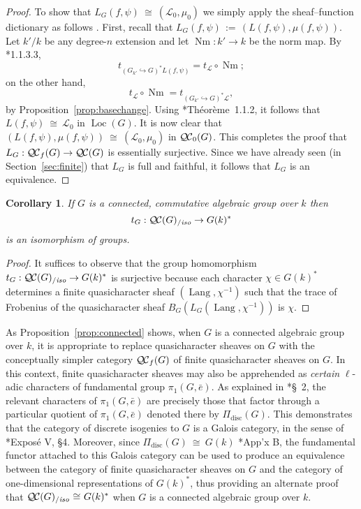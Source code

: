 \documentclass[11pt]{amsart}
\theoremstyle{plain}
\newtheorem{corollary}[theorem]{Corollary}
\theoremstyle{definition}
\theoremstyle{remark}
\newcommand{\bFq}{\bar{k}}
\newcommand{\Fq}{k}
\DeclareMathOperator{\Gal}{Gal}
\DeclareMathOperator{\Nm}{Nm}
\newcommand{\ceq}{{\, :=\, }}
\newcommand{\iso}{{\ \cong\ }}
\newcommand{\qcs}[1]{{\mathcal{#1}}}
\newcommand{\QC}{{\mathcal{Q\hskip-0.8pt C}}}
\newcommand{\QCb}{{\QC_0}}
\newcommand{\QCf}{{\QC_f}}
\newcommand{\QCiso}[1]{\QC(#1)_{/\textit{iso}}}
\newcommand{\Lang}{{\operatorname{Lang}}}
\newcommand{\Loc}{{\operatorname{Loc}}}
\newcommand{\trFrob}[1]{t_{#1}}
\newcommand\Clifton[1]{\marginpar{\smaller\smaller CC: #1}}
\begin{document}
\begin{proof}
  To show that $L_G(f,\psi) \iso (\qcs{L}_0,\mu_0)$ we simply apply the sheaf--function dictionary
  as follows .
  First, recall that $L_G(f,\psi) \ceq (L(f,\psi), \mu(f,\psi))$.
  Let $k'/k$ be any degree-$n$ extension and let $\Nm : k'\to k$ be the norm map. 
  By \cite{laumon:87a}*{1.1.3.3}, 
  \[
  \trFrob{(G_{k'}\hookrightarrow G)^*L(f,\psi)} = \trFrob{\qcs{L}} \circ \Nm;
  \]
  on the other hand, 
  \[
  \trFrob{\qcs{L}} \circ \Nm = \trFrob{(G_{k'}\hookrightarrow G)^*\qcs{L}},
  \]
   by Proposition~\ref{prop:basechange}.
  Using \cite{laumon:87a}*{Th\'eor\`eme~1.1.2}, it follows that  $L(f,\psi) \iso \qcs{L}_0$ in $\Loc(G)$.
  It is now clear that $(L(f,\psi),\mu(f,\psi)) \iso (\qcs{L}_0,\mu_0)$ in $\QCb(G)$.
  This completes the proof that $L_G : \QCf(G) \to \QC(G)$ is essentially surjective.
  Since we have already seen (in Section~\ref{sec:finite}) that $L_G$ is full and faithful, 
  it follows that $L_G$ is an equivalence.
\end{proof}

\begin{corollary}
 If $G$ is a connected, commutative algebraic group over $\Fq$ then
 \[
  \trFrob{G} : \QCiso{G} \to G(\Fq)^*
 \]
 is an isomorphism of groups.
\end{corollary}
\begin{proof}
 It suffices to observe that the group homomorphism
 $\trFrob{G} : \QCiso{G} \to G(\Fq)^*$
 is surjective because each character $\chi \in G(\Fq)^*$ determines a finite quasicharacter
 sheaf $(\Lang,\chi^{-1})$ such that the trace of Frobenius of the quasicharacter sheaf
 $B_G (L_G(\Lang,\chi^{-1}))$ is $\chi$.
\end{proof}

As Proposition~\ref{prop:connected} shows, 
when $G$ is a connected algebraic group over $\Fq$, 
it is appropriate to replace quasicharacter sheaves on $G$ 
with the conceptually simpler category $\QCf(G)$ of finite quasicharacter sheaves on $G$. 
In this context, finite quasicharacter sheaves may also be apprehended as
\emph{certain} $\ell$-adic characters of fundamental group $\pi_1(G,{\bar e})$. 
As explained in \cite{kamgarpour:09a}*{\S~2}, 
the relevant characters of $\pi_1(G,{\bar e})$ are precisely those 
that factor through a particular quotient of $\pi_1(G,{\bar e})$ 
denoted there by $\Pi_\text{disc}(G)$.
This demonstrates that the category of discrete isogenies to $G$ is a Galois category,
in the sense of \cite{grothendieck:SGA1}*{Expos\'e V, \S 4}. 
\Clifton{Is this better?}
Moreover, since $\Pi_\text{disc}(G) \iso G(\Fq)$ \cite{kamgarpour:09a}*{App'x B}, 
the fundamental functor attached to this Galois category can be used to produce an equivalence
between the category of finite quasicharacter sheaves on $G$ and
the category of one-dimensional representations of $G(\Fq)^*$, thus
providing an alternate proof that $\QCiso{G} \iso G(\Fq)^*$ 
when $G$ is a connected algebraic group over $\Fq$.
\end{document}
